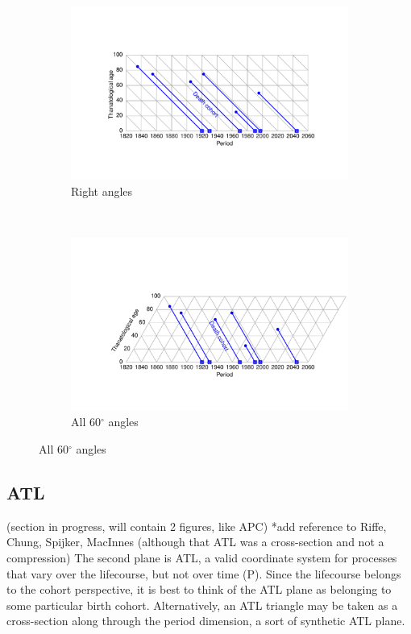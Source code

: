 \documentclass[11pt,oneside,a4paper]{article} %
\newcommand\tgh[1]{\raisebox{-.25\height}{\texttt{[image: Figures/triadtable/triad\#1.pdf]}}}
\begin{document}
\begin{figure} 
\caption{A TPD diagram in two projections.}
\label{fig:TPD}
\centering
\begin{subfigure}{1.1\textwidth}
\caption{Right angles}
\vspace{-6em}
\label{fig:TPDrt}
\includegraphics[scale=0.6]{Figures/TPDrt.pdf}
\end{subfigure}
\\\vspace{-2em}
\begin{subfigure}{1.1\textwidth}
\caption{All 60$^\circ$ angles}
\vspace{-6em}
\label{fig:TPDeq}
\includegraphics[scale=0.6]{Figures/TPDeq.pdf}
\end{subfigure}
\end{figure} 

\FloatBarrier
\subsection*{ATL}%
(section in progress, will contain 2 figures, like APC)
*add reference to Riffe, Chung, Spijker, MacInnes (although that ATL was a
cross-section and not a compression) 
The second plane is ATL, a valid coordinate
system for processes that vary over the lifecourse, but not over time (P). Since the
lifecourse belongs to the cohort perspective, it is best to think of the ATL
plane as belonging to some particular birth cohort. Alternatively, an ATL
triangle may be taken as a cross-section along through the period dimension, a
sort of synthetic ATL plane.
\end{document}
